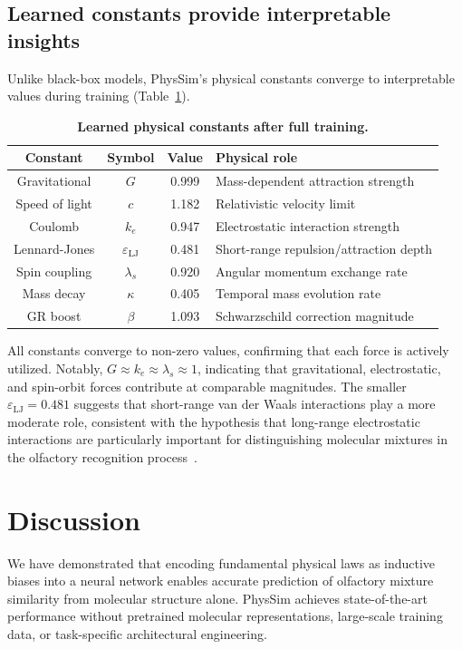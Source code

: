 \documentclass[11pt,a4paper]{article}
\begin{document}
\subsection{Learned constants provide interpretable insights}

Unlike black-box models, PhysSim's physical constants converge to interpretable values during training (Table~\ref{tab:constants}).

\begin{table}[h]
\centering
\caption{\textbf{Learned physical constants after full training.}}
\label{tab:constants}
\begin{tabular}{cccp{6cm}}
\toprule
\textbf{Constant} & \textbf{Symbol} & \textbf{Value} & \textbf{Physical role} \\
\midrule
Gravitational & $G$ & 0.999 & Mass-dependent attraction strength \\
Speed of light & $c$ & 1.182 & Relativistic velocity limit \\
Coulomb & $k_e$ & 0.947 & Electrostatic interaction strength \\
Lennard-Jones & $\varepsilon_{\text{LJ}}$ & 0.481 & Short-range repulsion/attraction depth \\
Spin coupling & $\lambda_s$ & 0.920 & Angular momentum exchange rate \\
Mass decay & $\kappa$ & 0.405 & Temporal mass evolution rate \\
GR boost & $\beta$ & 1.093 & Schwarzschild correction magnitude \\
\bottomrule
\end{tabular}
\end{table}

All constants converge to non-zero values, confirming that each force is actively utilized. Notably, $G \approx k_e \approx \lambda_s \approx 1$, indicating that gravitational, electrostatic, and spin-orbit forces contribute at comparable magnitudes. The smaller $\varepsilon_{\text{LJ}} = 0.481$ suggests that short-range van der Waals interactions play a more moderate role, consistent with the hypothesis that long-range electrostatic interactions are particularly important for distinguishing molecular mixtures in the olfactory recognition process~\cite{block2015}.

\section{Discussion}

We have demonstrated that encoding fundamental physical laws as inductive biases into a neural network enables accurate prediction of olfactory mixture similarity from molecular structure alone. PhysSim achieves state-of-the-art performance without pretrained molecular representations, large-scale training data, or task-specific architectural engineering.
\end{document}

